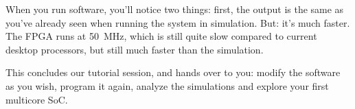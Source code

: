 When you run software, you'll notice two things: first, the output is the same as you've already seen when running the system in simulation.
But: it's much faster. The FPGA runs at 50~MHz, which is still quite slow compared to current desktop processors, but still much faster than the simulation.

This concludes our tutorial session, and hands over to you:
modify the software as you wish, program it again, analyze the simulations and explore your first multicore SoC.
